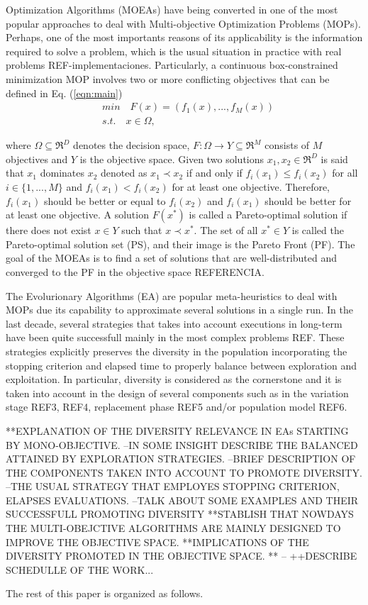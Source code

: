  Optimization Algorithms (MOEAs) have being converted in one of the most popular approaches to deal with Multi-objective Optimization Problems (MOPs).
%
Perhaps, one of the most importants reasons of its applicability is the information required to solve a problem, which is the usual situation in practice with real problems REF-implementaciones.
%
Particularly, a continuous box-constrained minimization MOP involves two or more conflicting objectives that can be defined in Eq. (\ref{eqn:main})
\begin{equation}\label{eqn:main}
\begin{split}
&min \quad F(x) = (f_1(x), ..., f_M(x)) \\
&s.t. \quad x \in \Omega,
\end{split}
\end{equation}

where $\Omega \subseteq \Re^D$ denotes the decision space, $F: \Omega \rightarrow Y \subseteq \Re^M$ consists of $M$ objectives and $Y$ is the objective space.
%
Given two solutions $x_1, x_2 \in \Re^D$ is said that $x_1$ dominates $x_2$ denoted as $x_1 \prec x_2$ if and only if $f_i(x_1) \leq f_i(x_2)$ for all $i \in \{1,...,M\}$ and $f_i(x_1) < f_i(x_2)$ for at least one objective.
%
Therefore, $f_i(x_1)$ should be better or equal to $f_i(x_2)$ and $f_i(x_1)$ should be better for at least one objective.
%
A solution $F(x^*)$ is called a Pareto-optimal solution if there does not exist $x \in Y$ such that $x \prec x^*$.
%
The set of all $x^* \in Y$ is called the Pareto-optimal solution set (PS), and their image is the Pareto Front (PF).
%
The goal of the MOEAs is to find a set of solutions that are well-distributed and converged to the PF in the objective space REFERENCIA.
%

The Evolurionary Algorithms (EA) are popular meta-heuristics to deal with MOPs due its capability to approximate several solutions in a single run.
%
In the last decade, several strategies that takes into account executions in long-term have been quite successfull mainly in the most complex problems REF.
%
These strategies explicitly preserves the diversity in the population incorporating the stopping criterion and elapsed time to properly balance between exploration and exploitation.
%
In particular, diversity is considered as the cornerstone and it is taken into account in the design of several components such as in the variation stage REF3, REF4, replacement phase REF5 and/or population model REF6.
%

%
**EXPLANATION OF THE DIVERSITY RELEVANCE IN EAs STARTING BY MONO-OBJECTIVE.
	--IN SOME INSIGHT DESCRIBE THE BALANCED ATTAINED BY EXPLORATION STRATEGIES.
	--BRIEF DESCRIPTION OF THE COMPONENTS TAKEN INTO ACCOUNT TO PROMOTE DIVERSITY.
	--THE USUAL STRATEGY THAT EMPLOYES STOPPING CRITERION, ELAPSES EVALUATIONS.
	--TALK ABOUT SOME EXAMPLES AND THEIR SUCCESSFULL PROMOTING DIVERSITY
**STABLISH THAT NOWDAYS THE MULTI-OBEJCTIVE ALGORITHMS ARE MAINLY DESIGNED TO IMPROVE THE OBJECTIVE SPACE.
**IMPLICATIONS OF THE DIVERSITY PROMOTED IN THE OBJECTIVE SPACE.
**
	--
++DESCRIBE SCHEDULLE OF THE WORK...


The rest of this paper is organized as follows.

